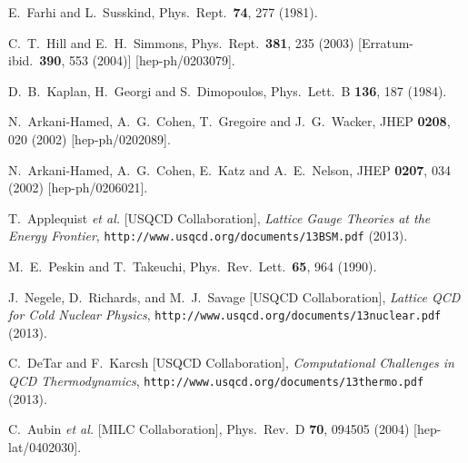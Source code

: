 \begin{thebibliography}{99}
  E.~Farhi and L.~Susskind,
  Phys.\ Rept.\  {\bf 74}, 277 (1981).
  
  C.~T.~Hill and E.~H.~Simmons,
  Phys.\ Rept.\  {\bf 381}, 235 (2003)
  [Erratum-ibid.\  {\bf 390}, 553 (2004)]
  [hep-ph/0203079].
  
  D.~B.~Kaplan, H.~Georgi and S.~Dimopoulos,
  Phys.\ Lett.\ B {\bf 136}, 187 (1984).
  
  N.~Arkani-Hamed, A.~G.~Cohen, T.~Gregoire and J.~G.~Wacker,
  JHEP {\bf 0208}, 020 (2002)
  [hep-ph/0202089].
  
  N.~Arkani-Hamed, A.~G.~Cohen, E.~Katz and A.~E.~Nelson,
  JHEP {\bf 0207}, 034 (2002)
  [hep-ph/0206021].

T.~Applequist {\em et al.} [USQCD Collaboration],
{\em Lattice Gauge Theories at the Energy Frontier},
{\tt http://www.usqcd.org/documents/13BSM.pdf} (2013).

  M.~E.~Peskin and T.~Takeuchi,
  Phys.\ Rev.\ Lett.\  {\bf 65}, 964 (1990).

J.~Negele, D.~Richards, and M.~J.~Savage [USQCD Collaboration],
{\em Lattice QCD for Cold Nuclear Physics},
{\tt http://www.usqcd.org/documents/13nuclear.pdf} (2013).

C.~DeTar and F.~Karcsh [USQCD Collaboration],
{\em Computational Challenges in QCD Thermodynamics},
{\tt http://www.usqcd.org/documents/13thermo.pdf} (2013).


  C.~Aubin {\it et al.} [MILC Collaboration],
  Phys.\ Rev.\ D {\bf 70}, 094505 (2004)
  [hep-lat/0402030].
  

\end{thebibliography}
